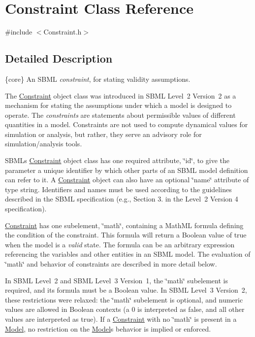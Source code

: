 \hypertarget{class_constraint}{}\section{Constraint Class Reference}
\label{class_constraint}


{\ttfamily \#include $<$Constraint.\+h$>$}



\subsection{Detailed Description}
\{core\} An S\+B\+ML {\itshape constraint}, for stating validity assumptions.

The \hyperlink{class_constraint}{Constraint} object class was introduced in S\+B\+ML Level~2 Version~2 as a mechanism for stating the assumptions under which a model is designed to operate. The {\itshape constraints} are statements about permissible values of different quantities in a model. Constraints are not used to compute dynamical values for simulation or analysis, but rather, they serve an advisory role for simulation/analysis tools.

S\+B\+ML\textquotesingle{}s \hyperlink{class_constraint}{Constraint} object class has one required attribute, \char`\"{}id\char`\"{}, to give the parameter a unique identifier by which other parts of an S\+B\+ML model definition can refer to it. A \hyperlink{class_constraint}{Constraint} object can also have an optional \char`\"{}name\char`\"{} attribute of type {\ttfamily string}. Identifiers and names must be used according to the guidelines described in the S\+B\+ML specification (e.\+g., Section 3. in the Level~2 Version 4 specification).

\hyperlink{class_constraint}{Constraint} has one subelement, \char`\"{}math\char`\"{}, containing a Math\+ML formula defining the condition of the constraint. This formula will return a Boolean value of {\ttfamily true} when the model is a {\itshape valid} state. The formula can be an arbitrary expression referencing the variables and other entities in an S\+B\+ML model. The evaluation of \char`\"{}math\char`\"{} and behavior of constraints are described in more detail below.

In S\+B\+ML Level~2 and S\+B\+ML Level~3 Version~1, the \char`\"{}math\char`\"{} subelement is required, and its formula must be a Boolean value. In S\+B\+ML Level~3 Version~2, these restrictions were relaxed\+: the \char`\"{}math\char`\"{} subelement is optional, and numeric values are allowed in Boolean contexts (a \textquotesingle{}0\textquotesingle{} is interpreted as {\ttfamily false}, and all other values are interpreted as {\ttfamily true}). If a \hyperlink{class_constraint}{Constraint} with no \char`\"{}math\char`\"{} is present in a \hyperlink{class_model}{Model}, no restriction on the \hyperlink{class_model}{Model}\textquotesingle{}s behavior is implied or enforced.

